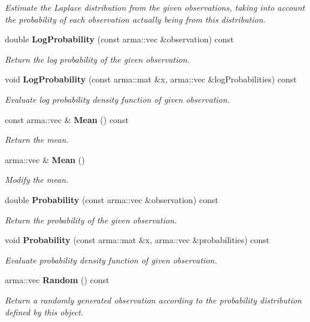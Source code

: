\begin{DoxyCompactItemize}
\begin{DoxyCompactList}\small\item\em Estimate the Laplace distribution from the given observations, taking into account the probability of each observation actually being from this distribution. \end{DoxyCompactList}\item 
double \textbf{ Log\+Probability} (const arma\+::vec \&observation) const
\begin{DoxyCompactList}\small\item\em Return the log probability of the given observation. \end{DoxyCompactList}\item 
void \textbf{ Log\+Probability} (const arma\+::mat \&x, arma\+::vec \&log\+Probabilities) const
\begin{DoxyCompactList}\small\item\em Evaluate log probability density function of given observation. \end{DoxyCompactList}\item 
const arma\+::vec \& \textbf{ Mean} () const
\begin{DoxyCompactList}\small\item\em Return the mean. \end{DoxyCompactList}\item 
arma\+::vec \& \textbf{ Mean} ()
\begin{DoxyCompactList}\small\item\em Modify the mean. \end{DoxyCompactList}\item 
double \textbf{ Probability} (const arma\+::vec \&observation) const
\begin{DoxyCompactList}\small\item\em Return the probability of the given observation. \end{DoxyCompactList}\item 
void \textbf{ Probability} (const arma\+::mat \&x, arma\+::vec \&probabilities) const
\begin{DoxyCompactList}\small\item\em Evaluate probability density function of given observation. \end{DoxyCompactList}\item 
arma\+::vec \textbf{ Random} () const
\begin{DoxyCompactList}\small\item\em Return a randomly generated observation according to the probability distribution defined by this object. \end{DoxyCompactList}\item 

\end{DoxyCompactItemize}
